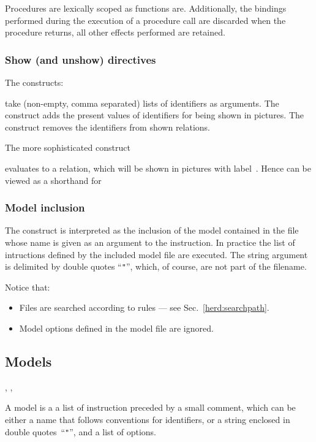 Procedures are lexically scoped as functions are.
Additionally, the bindings performed during the execution of a procedure call
are discarded when the procedure returns, all other effects performed are
retained.

\subsubsection*{Show (and unshow) directives}
\label{show:def}The constructs:
\begin{center}
\quad{}
\end{center}
take (non-empty, comma separated) lists of identifiers as arguments.
The  construct adds the present values of identifiers for being
shown in pictures.
The  construct removes the identifiers from shown relations.

The more sophisticated construct
\begin{center}\end{center}
evaluates  to a relation, which will be shown in pictures with
label~.
Hence   can be viewed as a shorthand
for 

\subsubsection*{Model inclusion}
The construct  is interpreted as
the inclusion of the model contained in the file whose name is given as
an argument to the  instruction.
In practice the list of intructions defined by the included model file
are executed.
The string argument is delimited by double quotes ``\verb+"+'',
which, of course, are not part of the filename.


Notice that:
\begin{itemize}
\item Files are searched according to \herd{} rules --- see Sec.~\ref{herd:searchpath}.
\item Model options defined in the model file  are ignored.
\end{itemize}


\subsection{\label{language:model}Models}
\begin{syntax}
 \is {}  \brepet {} \erepet \brepet {} \erepet
\sep
{} \is {} \orelse  {}
\sep
{} \is {} \orelse {}
\orelse {} \orelse {}
\end{syntax}
A model is a a list of instruction preceded by a small comment,
which can be either a name that follows \herd{} conventions for identifiers,
or a string enclosed in double quotes~``\verb+"+'',
and a list of options.

